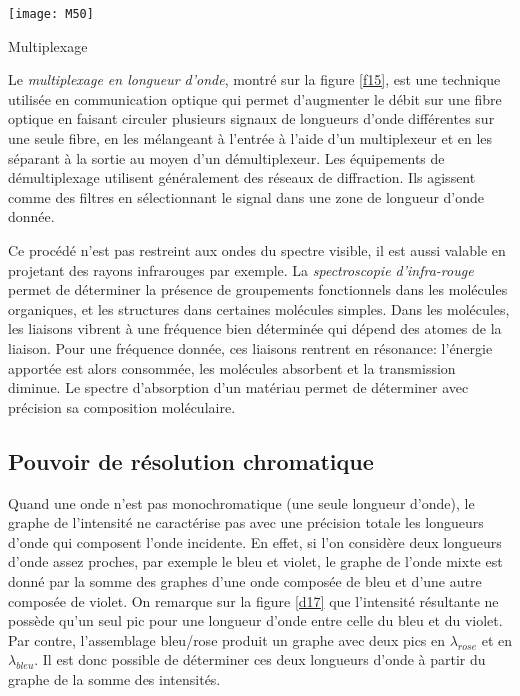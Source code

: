 \begin{marginfigure}[-1cm]
\texttt{[image: M50]}
\caption{Multiplexage}
\label{f15}
\end{marginfigure}

\noindent Le \textit{multiplexage en longueur d'onde}, montré sur la figure \ref{f15}, est une technique utilisée en communication optique qui permet d'augmenter le débit sur une fibre optique en faisant circuler plusieurs signaux de longueurs d'onde différentes sur une seule fibre, en les mélangeant à l'entrée à l'aide d'un multiplexeur et en les séparant à la sortie au moyen d'un démultiplexeur. Les équipements de démultiplexage utilisent généralement des réseaux de diffraction. Ils agissent comme des filtres en sélectionnant le signal dans une zone de longueur d'onde donnée.

\noindent Ce procédé n'est pas restreint aux ondes du spectre visible, il est aussi valable en projetant des rayons infrarouges par exemple. La \textit{spectroscopie d'infra-rouge} permet de déterminer la présence de groupements fonctionnels dans les molécules organiques, et les structures dans certaines molécules simples. Dans les molécules, les liaisons vibrent à une fréquence bien déterminée qui dépend des atomes de la liaison. Pour une fréquence donnée, ces liaisons rentrent en résonance: l'énergie apportée est alors consommée, les molécules absorbent et la transmission diminue. Le spectre d'absorption d'un matériau permet de déterminer avec précision sa composition moléculaire.

\subsection{Pouvoir de résolution chromatique}

Quand une onde n'est pas monochromatique (une seule longueur d'onde), le graphe de l'intensité ne caractérise pas avec une précision totale les longueurs d'onde qui composent l'onde incidente. En effet, si l'on considère deux longueurs d'onde assez proches, par exemple le bleu et violet, le graphe de l'onde mixte est donné par la somme des graphes d'une onde composée de bleu et d'une autre composée de violet. On remarque sur la figure \ref{d17} que l'intensité résultante ne possède qu'un seul pic pour une longueur d'onde entre celle du bleu et du violet. Par contre, l'assemblage bleu/rose produit un graphe avec deux pics en $\lambda_{rose}$ et en $\lambda_{bleu}$. Il est donc possible de déterminer ces deux longueurs d'onde à partir du graphe de la somme des intensités.

